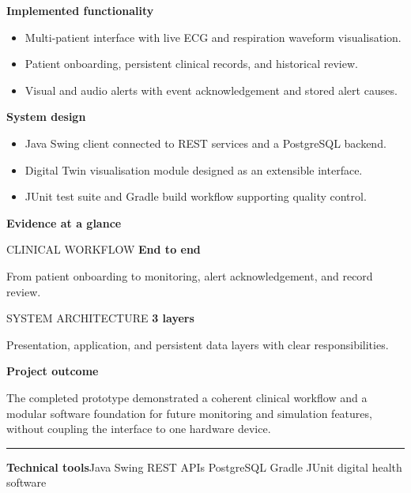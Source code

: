 \documentclass[10pt,a4paper]{article}
\begin{document}
\begin{minipage}[t]{0.485\linewidth}
\textbf{Implemented functionality}\par\vspace{3pt}
\begin{itemize}
\item Multi-patient interface with live ECG and respiration waveform visualisation.
\item Patient onboarding, persistent clinical records, and historical review.
\item Visual and audio alerts with event acknowledgement and stored alert causes.
\end{itemize}
\end{minipage}\hfill
\begin{minipage}[t]{0.485\linewidth}
\textbf{System design}\par\vspace{3pt}
\begin{itemize}
\item Java Swing client connected to REST services and a PostgreSQL backend.
\item Digital Twin visualisation module designed as an extensible interface.
\item JUnit test suite and Gradle build workflow supporting quality control.
\end{itemize}
\end{minipage}
\vspace{10pt}
\textbf{Evidence at a glance}\par\vspace{5pt}
\begin{minipage}[t]{0.485\linewidth}
\begin{metricbox}{CLINICAL WORKFLOW}
{\Large\bfseries\color{navy} End to end}\par\vspace{2pt}
From patient onboarding to monitoring, alert acknowledgement, and record review.
\end{metricbox}
\end{minipage}\hfill
\begin{minipage}[t]{0.485\linewidth}
\begin{metricbox}{SYSTEM ARCHITECTURE}
{\Large\bfseries\color{navy} 3 layers}\par\vspace{2pt}
Presentation, application, and persistent data layers with clear responsibilities.
\end{metricbox}
\end{minipage}
\vspace{10pt}
\textbf{Project outcome}\par\vspace{3pt}
The completed prototype demonstrated a coherent clinical workflow and a modular software foundation for future monitoring and simulation features, without coupling the interface to one hardware device.
\vfill
\color{navy}\rule{\linewidth}{0.35pt}\par\vspace{4pt}
{\footnotesize\textbf{Technical tools}\quad Java \enspace Swing \enspace REST APIs \enspace PostgreSQL \enspace Gradle \enspace JUnit \enspace digital health software}
\end{document}
